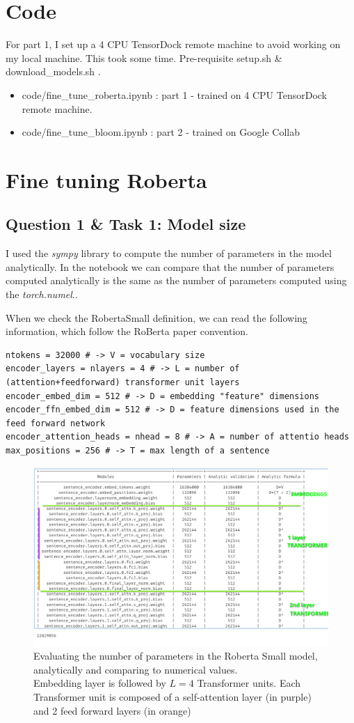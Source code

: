 \documentclass[a4paper]{article}
\begin{document}

\section*{Code}
For part 1, I set up a 4 CPU TensorDock remote machine to avoid working on my local machine.
This took some time. Pre-requisite setup.sh \& download\_models.sh .

\begin{itemize}
    \item code/fine\_tune\_roberta.ipynb : part 1 - trained on 4 CPU TensorDock remote machine.
    \item code/fine\_tune\_bloom.ipynb : part 2 - trained on Google Collab
\end{itemize}

\section{Fine tuning Roberta\cite{liu2019roberta}}
\subsection*{Question 1 \& Task 1: Model size}
I used the \textit{sympy} library to compute the number of parameters in the model analytically.
In the notebook we can compare that the number of parameters computed analytically is the same as the number of parameters computed using the \textit{torch.numel}..


When we check the RobertaSmall definition, we can read the following information, which follow the RoBerta\cite{liu2019roberta} paper convention.
\begin{verbatim}
ntokens = 32000 # -> V = vocabulary size
encoder_layers = nlayers = 4 # -> L = number of (attention+feedforward) transformer unit layers
encoder_embed_dim = 512 # -> D = embedding "feature" dimensions
encoder_ffn_embed_dim = 512 # -> D = feature dimensions used in the feed forward network
encoder_attention_heads = nhead = 8 # -> A = number of attentio heads
max_positions = 256 # -> T = max length of a sentence
\end{verbatim}


\begin{figure}[ht]
    \centering
    \includegraphics[width=.6\textwidth]{figures/roberta_params.png}
    \caption{Evaluating the number of parameters in the Roberta Small model, analytically and comparing to numerical values. \\ 
    Embedding layer is followed by $L=4$ Transformer units. Each Transformer unit is composed of a self-attention layer (in purple) and 2 feed forward layers (in orange)}
    \label{fig:roberta_params}
\end{figure}
\end{document}
